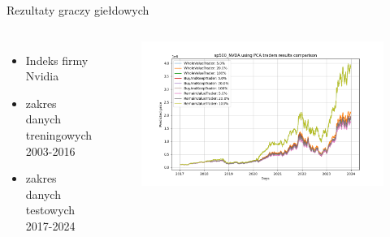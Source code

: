 \begin{frame}{Rezultaty graczy giełdowych}
    \begin{columns}[t]
            \begin{itemize}
                \item Indeks firmy Nvidia
                \item zakres danych treningowych 2003-2016
                \item zakres danych testowych 2017-2024
            \end{itemize}
        \centering
        \begin{figure}
            \centering
            \includegraphics[width=1\textwidth]{images/pca_nvidia_traders.png}
        \end{figure}    
    \end{columns}
\end{frame}
